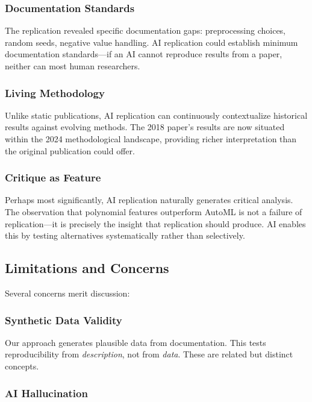 \documentclass[conference]{IEEEtran}
\begin{document}
\subsubsection{Documentation Standards}

The replication revealed specific documentation gaps: preprocessing choices, random seeds, negative value handling. AI replication could establish minimum documentation standards---if an AI cannot reproduce results from a paper, neither can most human researchers.

\subsubsection{Living Methodology}

Unlike static publications, AI replication can continuously contextualize historical results against evolving methods. The 2018 paper's results are now situated within the 2024 methodological landscape, providing richer interpretation than the original publication could offer.

\subsubsection{Critique as Feature}

Perhaps most significantly, AI replication naturally generates critical analysis. The observation that polynomial features outperform AutoML is not a failure of replication---it is precisely the insight that replication should produce. AI enables this by testing alternatives systematically rather than selectively.

\subsection{Limitations and Concerns}

Several concerns merit discussion:

\subsubsection{Synthetic Data Validity}

Our approach generates plausible data from documentation. This tests reproducibility from \textit{description}, not from \textit{data}. These are related but distinct concepts.

\subsubsection{AI Hallucination}
\end{document}
